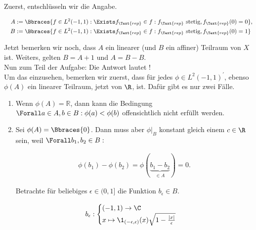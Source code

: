 \begin{solution}

Zuerst, entschlüsseln wir die Angabe.

\begin{align*}
  A & :=
  \Bbraces
  {
    f \in L^2(-1, 1):
    \Exists f_\Text{rep} \in f:
    f_\Text{rep} \text{ stetig},
    f_\Text{rep}(0) = 0
  }, \\
  \quad
  B & :=
  \Bbraces
  {
    f \in L^2(-1, 1):
    \Exists f_\Text{rep} \in f:
    f_\Text{rep} \text{ stetig},
    f_\Text{rep}(0) = 1
  }
\end{align*}

Jetzt bemerken wir noch, dass $A$ ein linearer (und $B$ ein affiner) Teilraum von $X$ ist.
Weiters, gelten $B = A + 1$ und $A = B - B$. \\

Nun zum  Teil der Aufgabe:
Die Antwort lautet ! \\

Um das einzusehen, bemerken wir zuerst, dass für jedes $\phi \in L^2(-1, 1)^\prime$, ebenso $\phi(A)$ ein linearer Teilraum, jetzt von $\R$, ist.
Dafür gibt es nur zwei Fälle.

\begin{enumerate}[label = Fall \arabic*:]

  \item
  Wenn $\phi(A) = \mathbb{R}$, dann kann die Bedingung $\Forall a \in A, b \in B: \phi(a) < \phi(b)$
  offensichtlich nicht erfüllt werden.

  \item
  Sei $\phi(A) = \Bbraces{0}$.
  Dann muss aber $\phi|_B$ konstant gleich einem $c \in \R$ sein, weil $\Forall b_1, b_2 \in B:$

  \begin{align*}
    \phi(b_1) - \phi(b_2)
    =
    \phi(\underbrace{b_1 - b_2}_{\in A})
    =
    0.
  \end{align*}

  Betrachte für beliebiges $\epsilon \in (0, 1]$ die Funktion $b_\epsilon \in B$.

  \begin{align*}
    b_\epsilon:
    \begin{cases}
      (-1, 1) \to \C \\
      x \mapsto
      \1_{(-\epsilon, \epsilon)}(x)
      \sqrt{1 - \frac{|x|}{\epsilon}}
    \end{cases}
  \end{align*}


\end{enumerate}
\end{solution}

